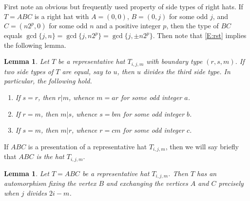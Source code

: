 \documentclass[12pt]{amsart}
\theoremstyle{plain}
\newtheorem{lemma}[theorem]{Lemma}
\theoremstyle{definition}
\numberwithin{equation}{section}
\begin{document}
  First note an obvious but frequently used property of side types of right hats. If $T =
ABC$ is a right hat with $A =
(0,0)$, $B = (0,j)$ for some odd $j$, and $C = (n2^p,0)$ for some odd $n$ and a positive integer $p$,
then the type of $BC$ equals $\gcd\{j,n\} = \gcd\{j,n2^p\} = \gcd\{j,\pm n2^p\}$. Then note that
\eqref{E:rst} implies the following lemma.



\begin{lemma}\label{C:double}
Let $T$ be a representative hat $T_{i,j,m}$ with boundary type $(r,s,m)$.
If two side types of $T$ are equal, say to $u$, then $u$ divides the third side type.
In particular, the following hold.
\begin{enumerate}
\item[(a)] If $s = r$, then $r|m$, whence $m = ar$ for some odd integer $a$.
\item[(b)] If $r = m$, then $m|s$, whence $s = bm$ for some odd integer $b$.
\item[(c)] If $s = m$, then $m|r$, whence $r = cm$ for some odd integer $c$.
\end{enumerate}
\end{lemma}



If $ABC$ is a presentation of a representative hat $T_{i,j,m}$, then we will say
briefly that \emph{$ABC$ is the hat $T_{i,j,m}$}.





\begin{lemma}\label{L:autfixB}
Let $T = ABC$ be a representative hat $T_{i,j,m}$.
Then $T$ has an automorphism fixing the
vertex $B$ and exchanging the vertices $A$ and $C$ precisely when $j$ divides $2i - m$.
\end{lemma}
\end{document}
